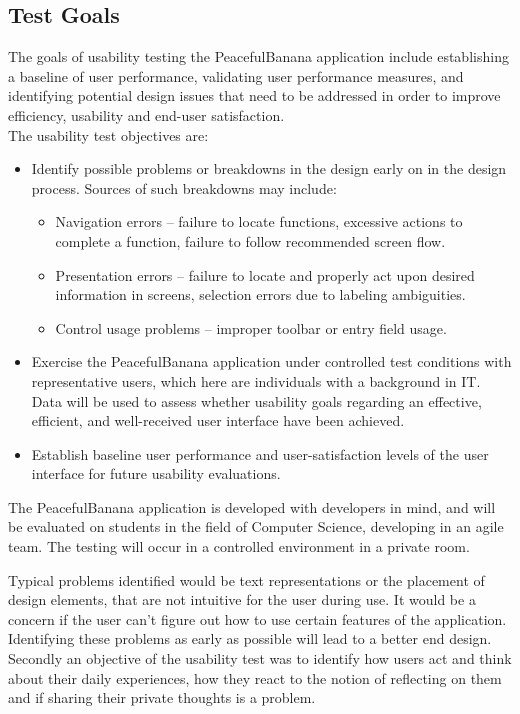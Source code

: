 \subsection{Test Goals}
The goals of usability testing the PeacefulBanana application include establishing a baseline of user performance, validating user performance measures, and identifying potential design issues that need to be addressed in order to improve efficiency, usability and end-user satisfaction. \\
The usability test objectives are:
\begin{itemize}
	\item Identify possible problems or breakdowns in the design\cite{ref:30} early on in the design process. Sources of such breakdowns may include:
		\begin{itemize}
			\item Navigation errors – failure to locate functions, excessive actions to complete a function, failure to follow recommended screen flow.
			\item Presentation errors – failure to locate and properly act upon desired information in screens, selection errors due to labeling ambiguities.
			\item Control usage problems – improper toolbar or entry field usage.
		\end{itemize}
	\item Exercise the PeacefulBanana application under controlled test conditions with representative users, which here are individuals with a background in IT. Data will be used to assess whether usability goals regarding an effective, efficient, and well-received user interface have been achieved.
	\item Establish baseline user performance and user-satisfaction levels of the user interface for future usability evaluations.
\end{itemize}
The PeacefulBanana application is developed with developers in mind, and will be evaluated on students in the field of Computer Science, developing in an agile team. The testing will occur in a controlled environment in a private room.

Typical problems identified would be text representations or the placement of design elements, that are not intuitive for the user during use. It would be a concern if the user can't figure out how to use certain features of the application. Identifying these problems as early as possible will lead to a better end design. \\
Secondly an objective of the usability test was to identify how users act and think about their daily experiences, how they react to the notion of reflecting on them and if sharing their private thoughts is a problem. 

